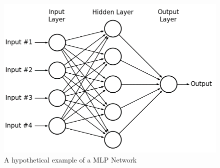 \begin{figure}[H]
\centering
\includegraphics[scale=0.35]{images/MLP.png}
\caption{A hypothetical example of a MLP Network}
\end{figure}